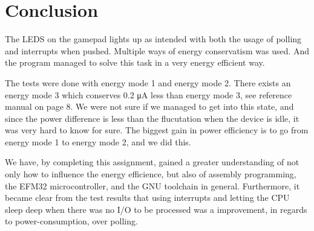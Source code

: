 \section{Conclusion}

The LEDS on the gamepad lights up as intended with both the usage of polling and interrupts when pushed. Multiple ways of energy conservatism was used. And the program managed to solve this task in a very energy efficient way.

The tests were done with energy mode 1 and energy mode 2. There exists an energy mode 3 which conserves 0.2 \si{\micro\ampere} less than energy mode 3, see reference manual \cite{efm32gg-ref-man} on page 8. We were not sure if we managed to get into this state, and since the power difference is less than the flucutation when the device is idle, it was very hard to know for sure. The biggest gain in power efficiency is to go from energy mode 1 to energy mode 2, and we did this.

We have, by completing this assignment, gained a greater understanding of not only how to influence the energy efficience, but also of assembly programming, the EFM32 microcontroller, and the GNU toolchain in general. Furthermore, it became clear from the test results that using interrupts and letting the CPU sleep deep when there was no I/O to be processed was a improvement, in regards to power-consumption, over polling.
